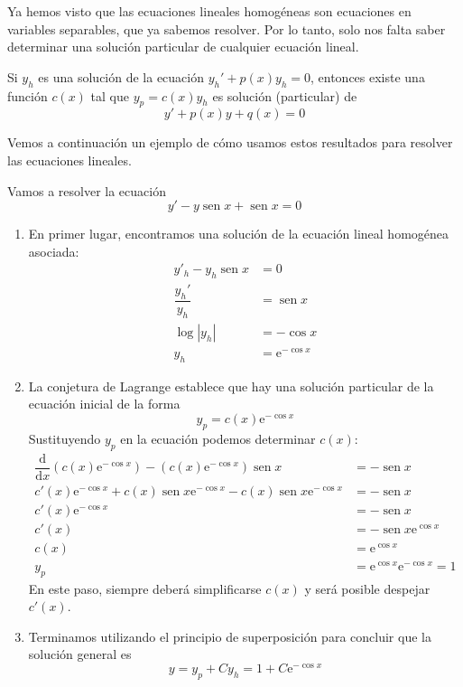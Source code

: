 Ya hemos visto que las ecuaciones lineales homogéneas son ecuaciones en variables separables, que ya sabemos resolver.
Por lo tanto, solo nos falta saber determinar una solución particular de cualquier ecuación lineal.
% 
\begin{teorema}
Si $y_h$ es una solución de la ecuación $y_h'+p(x)y_h=0$, entonces existe una función $c(x)$
tal que $y_p=c(x)y_h$ es solución (particular) de
\begin{equation}\label{eq:lineal2}
y'+p(x)y+q(x)=0
\end{equation}
\end{teorema}
%
Vemos a continuación un ejemplo de cómo usamos estos resultados para resolver las ecuaciones lineales.
%
\begin{ejemplo}
Vamos a resolver la ecuación
\begin{equation}\label{ej:ecdlineal}
y'-y\operatorname{sen} x +\operatorname{sen} x = 0
\end{equation}
\begin{enumerate}
\item
En primer lugar, encontramos una solución de la ecuación lineal homogénea asociada:
\begin{align*}
y'_h-y_h\operatorname{sen} x &= 0\\
\dfrac{y_h'}{y_h} &= \operatorname{sen} x \\
\log|y_h| &= -\cos x\\
y_h &= \mbox{e}^{-\cos x}
\end{align*}
\item
La conjetura de Lagrange establece que hay una solución particular de la ecuación inicial de la forma
\[
y_p = c(x)\mbox{e}^{-\cos x}
\]
Sustituyendo $y_p$ en la ecuación podemos determinar $c(x)$:
\begin{align*}
\dfrac{\mathrm d}{\mathrm dx}\left(c(x)\mbox{e}^{-\cos x}\right)-
\left(c(x)\mbox{e}^{-\cos x}\right)\operatorname{sen} x &= -\operatorname{sen} x\\
c'(x)\mbox{e}^{-\cos x}+c(x)\operatorname{sen} x\mbox{e}^{-\cos x}-c(x)\operatorname{sen} x\mbox{e}^{-\cos x} &= -\operatorname{sen} x\\
c'(x)\mbox{e}^{-\cos x} &= -\operatorname{sen} x\\
c'(x) &= -\operatorname{sen} x \mbox{e}^{\cos x} \\
c(x) &= \mbox{e}^{\cos x}\\
y_p &= \mbox{e}^{\cos x}\mbox{e}^{-\cos x}=1
\end{align*}
En este paso, siempre deberá simplificarse $c(x)$ y será posible despejar $c'(x)$.
\item
Terminamos utilizando el principio de superposición para concluir que la solución general es
\[
y = y_p + C y_h= 1+ C\mbox{e}^{-\cos x}\tag*{\fej}
\]
\end{enumerate}
\end{ejemplo}

